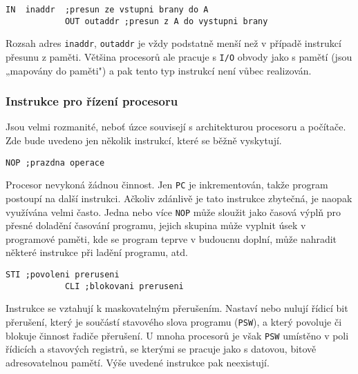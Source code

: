           \begin{lstlisting}[gobble=10]
            IN  inaddr  ;presun ze vstupni brany do A
            OUT outaddr ;presun z A do vystupni brany
          \end{lstlisting}        
          Rozsah adres \texttt{inaddr}, \texttt{outaddr} je vždy podstatně menší než v případě 
          instrukcí přesunu z paměti. Většina procesorů ale pracuje s \texttt{I/O} obvody jako s 
          pamětí (jsou „mapovány do paměti") a pak tento typ instrukcí není vůbec realizován.
          
        \subsubsection{Instrukce pro řízení procesoru}\label{MIT:sssec_inst_cpu_cntrl} 
          Jsou velmi rozmanité, neboť úzce souvisejí s architekturou procesoru a počítače. Zde bude 
          uvedeno jen několik instrukcí, které se běžně vyskytují.
          
          \begin{lstlisting}[gobble=10]
            NOP ;prazdna operace
          \end{lstlisting}
          Procesor nevykoná žádnou činnost. Jen \texttt{PC} je inkrementován, takže program 
          postoupí na další instrukci. Ačkoliv zdánlivě je tato instrukce zbytečná, je naopak 
          využívána velmi často. Jedna nebo více \texttt{NOP} může sloužit jako časová výplň pro 
          přesné doladění časování programu, jejich skupina může vyplnit úsek v programové paměti, 
          kde se program teprve v budoucnu doplní, může nahradit některé instrukce při ladění 
          programu, atd.
          
          \begin{lstlisting}[gobble=10]
            STI ;povoleni preruseni
            CLI ;blokovani preruseni
          \end{lstlisting}
          Instrukce se vztahují k maskovatelným přerušením. Nastaví nebo nulují řídicí bit 
          přerušení, který je součástí stavového slova programu (\texttt{PSW}), a který povoluje či 
          blokuje činnost řadiče přerušení. U mnoha procesorů je však \texttt{PSW} umístěno v poli 
          řídicích a stavových registrů, se kterými se pracuje jako s datovou, bitově 
          adresovatelnou pamětí. Výše uvedené instrukce pak neexistují.
          
